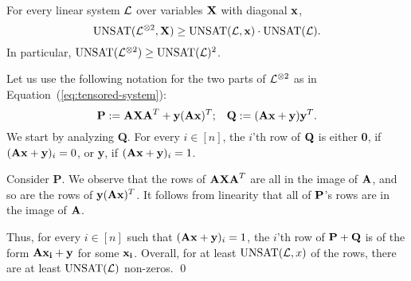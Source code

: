 \begin{lemma}\label{converse} For every linear system ${\cal L}$ over variables ${\bf X}$ with diagonal ${\bf x}$,
$$\mbox{UNSAT}({\cal L}^{\otimes 2},{\bf X}) \geq \mbox{UNSAT}({\cal L}, {\bf x})\cdot \mbox{UNSAT}({\cal L}).$$
In particular, $\mbox{UNSAT}({\cal L}^{\otimes 2}) \geq \mbox{UNSAT}({\cal L})^2$.
\end{lemma}
Let us use the following notation for the two parts of ${\cal L}^{\otimes
  2}$ as in Equation~(\ref{eq:tensored-system}):
$${\bf P}:= {\bf AXA}^T + {\bf y}({\bf Ax})^T;\;\;\; {\bf Q}:= ({\bf Ax} + {\bf y}){\bf y}^T.$$
We start by analyzing {\bf Q}. For every $i\in [n]$, the $i$'th row of
${\bf Q}$ is either {\bf 0}, if $({\bf Ax} + {\bf y})_i = 0$, or {\bf
  y}, if $({\bf Ax} + {\bf y})_i =1$.

Consider {\bf P}. We observe that the rows of ${\bf AXA}^T$ are all in
the image of ${\bf A}$, and so are the rows of ${\bf y}({\bf
  Ax})^T$. It follows from linearity that all of ${\bf P}$'s rows are
in the image of ${\bf A}$.

Thus, for every $i\in [n]$ such that $({\bf Ax} + {\bf y})_i =1$, the
$i$'th row of ${\bf P + Q}$ is of the form ${\bf A x_i} + {\bf y}$ for
some ${\bf x_i}$.  Overall, for at least $\mbox{UNSAT}({\cal L},x)$ of the
rows, there are at least $\mbox{UNSAT}({\cal L})$ non-zeros. \qed 

